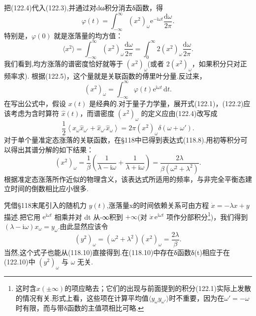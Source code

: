 把(122.4)代入(122.3),并通过对dω积分消去δ函数，得
\begin{equation}
  \varphi(t)=\int_{-\infty}^{\infty}(x^2)_\omega\mathrm{e}^{-\mathrm{i}\omega t}
  \frac{\mathrm{d}\omega}{2\pi}.
\end{equation}
特别是，$\varphi(0)$ 就是涨落量的均方值：
\begin{equation}
  \langle x^2\rangle=\int_{-\infty}^{\infty}(x^2)_\omega\frac{\mathrm{d}\omega}{2\pi}
  =\int_0^{\infty}2(x^2)_\omega\frac{\mathrm{d}\omega}{2\pi}.
\end{equation}
我们看到,均方涨落的谱密度恰好就等于 $(x^2)_\omega$(或者 $2(x^2)_\omega$，如果积分只对正频率求). 根据(122.5)，这个量就是关联函数的傅里叶分量.反过来，
\begin{equation}
  (x^2)_\omega=\int_{-\infty}^{\infty}\varphi(t)\mathrm{e}^{\mathrm{i}\omega t}\,\mathrm{d}t.
\end{equation}
在写出公式中，假设 $x(t)$ 是经典的.对于量子力学量，展开式(122.1)，(122.2)应该考虑为含时算符 $\hat{x}(t)$，而谱密度 $(x^2)_\omega$ 的定义应由(122.4)改写成
\begin{equation}
  \frac{1}{2}\left\langle\hat{x}_\omega\hat{x}_{\omega'}
  +\hat{x}_{\omega'}\hat{x}_\omega\right\rangle
  =2\pi(x^2)_\omega\delta(\omega+\omega').
\end{equation}
对于单个量准定态涨落的关联函数，在§118中已得到表达式(118.8).用初等积分可以得出其谱分解的如下结果：
\begin{equation}
  (x^2)_\omega=\frac{1}{\beta}\left(\frac{1}{\lambda-\mathrm{i}\omega}
  +\frac{1}{\lambda+\mathrm{i}\omega}\right)
  =\frac{2\lambda}{\beta(\omega^2+\lambda^2)}.
\end{equation}
根据准定态涨落所作近似的物理含义，该表达式所适用的频率，与非完全平衡态建立时间的倒数相比应小很多.

凭借§118末尾引入的随机力 $y(t)$,涨落量x的时间依赖关系可由方程 $\dot{x}=-\lambda x+y$ 描述.把它用 $\mathrm{e}^{\mathrm{i}\omega t}$ 相乘并对 dt 从-∞积到 $+\infty$(对 $\dot{x}\,\mathrm{e}^{\mathrm{i}\omega t}$ 项作分部积分\footnote{这时含$x(\pm\infty)$的项应略去；它们的出现与前面提到的积分(122.1)实际上发散的情况有关.形式上看，这些项在计算平均值$\langle y_\omega y_{\omega'}\rangle$时不重要，因为在$\omega'=-\omega$时有限，而与带δ函数的主值项相比可略.})，我们得到 $(\lambda-\mathrm{i}\omega)x_\omega=y_\omega$.由此显然应该令
\begin{equation}
  (y^2)_\omega=(\omega^2+\lambda^2)(x^2)_\omega=\frac{2\lambda}{\beta}.
\end{equation}
当然,这个式子也能从(118.10)直接得到.在(118.10)中存在δ函数δ(t)相应于在(122.10)中 $(y^2)_\omega$ 与 $\omega$ 无关.

